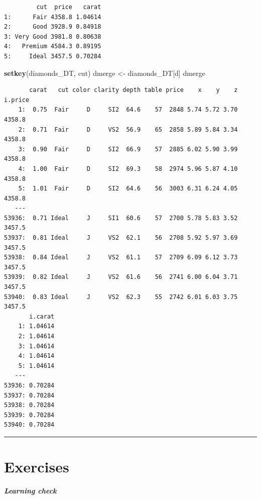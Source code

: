 \documentclass[
]{book}
\newenvironment{Shaded}{\begin{snugshade}}{\end{snugshade}}
\newcommand{\KeywordTok}[1]{\textcolor[rgb]{0.13,0.29,0.53}{\textbf{#1}}}
\newcommand{\NormalTok}[1]{#1}
\newcommand{\StringTok}[1]{\textcolor[rgb]{0.31,0.60,0.02}{#1}}
\begin{document}
\begin{verbatim}
         cut  price   carat
1:      Fair 4358.8 1.04614
2:      Good 3928.9 0.84918
3: Very Good 3981.8 0.80638
4:   Premium 4584.3 0.89195
5:     Ideal 3457.5 0.70284
\end{verbatim}

\begin{Shaded}
\begin{Highlighting}[]
\KeywordTok{setkey}\NormalTok{(diamonds_DT, cut)}
\NormalTok{dmerge <-}\StringTok{ }\NormalTok{diamonds_DT[d]}
\NormalTok{dmerge}
\end{Highlighting}
\end{Shaded}

\begin{verbatim}
       carat   cut color clarity depth table price    x    y    z i.price
    1:  0.75  Fair     D     SI2  64.6    57  2848 5.74 5.72 3.70  4358.8
    2:  0.71  Fair     D     VS2  56.9    65  2858 5.89 5.84 3.34  4358.8
    3:  0.90  Fair     D     SI2  66.9    57  2885 6.02 5.90 3.99  4358.8
    4:  1.00  Fair     D     SI2  69.3    58  2974 5.96 5.87 4.10  4358.8
    5:  1.01  Fair     D     SI2  64.6    56  3003 6.31 6.24 4.05  4358.8
   ---                                                                   
53936:  0.71 Ideal     J     SI1  60.6    57  2700 5.78 5.83 3.52  3457.5
53937:  0.81 Ideal     J     VS2  62.1    56  2708 5.92 5.97 3.69  3457.5
53938:  0.84 Ideal     J     VS2  61.1    57  2709 6.09 6.12 3.73  3457.5
53939:  0.82 Ideal     J     VS2  61.6    56  2741 6.00 6.04 3.71  3457.5
53940:  0.83 Ideal     J     VS2  62.3    55  2742 6.01 6.03 3.75  3457.5
       i.carat
    1: 1.04614
    2: 1.04614
    3: 1.04614
    4: 1.04614
    5: 1.04614
   ---        
53936: 0.70284
53937: 0.70284
53938: 0.70284
53939: 0.70284
53940: 0.70284
\end{verbatim}

\begin{center}\rule{0.5\linewidth}{0.5pt}\end{center}

\hypertarget{exercises}{%
\section{Exercises}\label{exercises}}

\begin{learncheck}
\textbf{\emph{Learning check}}
\end{learncheck}
\end{document}
